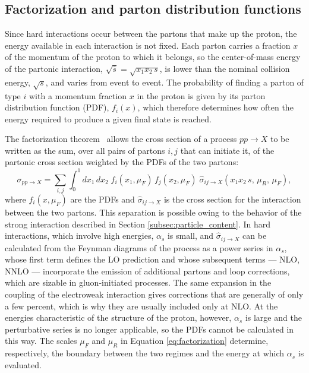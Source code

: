 \subsection{Factorization and parton distribution functions}
\label{subsec:pp_factorization}
%
Since hard interactions occur between the partons that make up the proton, the energy available in each interaction is not fixed. Each parton carries a fraction $x$ of the momentum of the proton to which it belongs, so the center-of-mass energy of the partonic interaction, $\sqrt{\hat{s}}=\sqrt{x_1x_2\,s}$, is lower than the nominal collision energy, $\sqrt{s}$, and varies from event to event. The probability of finding a parton of type $i$ with a momentum fraction $x$ in the proton is given by its parton distribution function (PDF), $f_i(x)$, which therefore determines how often the energy required to produce a given final state is reached.


The factorization theorem~\cite{Collins:1989gx} allows the cross section of a process $pp\to X$ to be written as the sum, over all pairs of partons $i,j$ that can initiate it, of the partonic cross section weighted by the PDFs of the two partons:
\begin{equation}
    \sigma_{pp\to X} = \sum_{i,j}\int_0^1 dx_1\,dx_2\; f_i(x_1,\mu_F)\,f_j(x_2,\mu_F)\;\hat{\sigma}_{ij\to X}(x_1x_2\,s,\,\mu_R,\,\mu_F),
    \label{eq:factorization}
\end{equation}
where $f_i(x,\mu_F)$ are the PDFs and $\hat{\sigma}_{ij\to X}$ is the cross section for the interaction between the two partons. This separation is possible owing to the behavior of the strong interaction described in Section \ref{subsec:particle_content}. In hard interactions, which involve high energies, $\alpha_s$ is small, and $\hat{\sigma}_{ij\to X}$ can be calculated from the Feynman diagrams of the process as a power series in $\alpha_s$, whose first term defines the LO prediction and whose subsequent terms — NLO, NNLO — incorporate the emission of additional partons and loop corrections, which are sizable in gluon-initiated processes. The same expansion in the coupling of the electroweak interaction gives corrections that are generally of only a few percent, which is why they are usually included only at NLO. At the energies characteristic of the structure of the proton, however, $\alpha_s$ is large and the perturbative series is no longer applicable, so the PDFs cannot be calculated in this way. The scales $\mu_F$ and $\mu_R$ in Equation \ref{eq:factorization} determine, respectively, the boundary between the two regimes and the energy at which $\alpha_s$ is evaluated.



